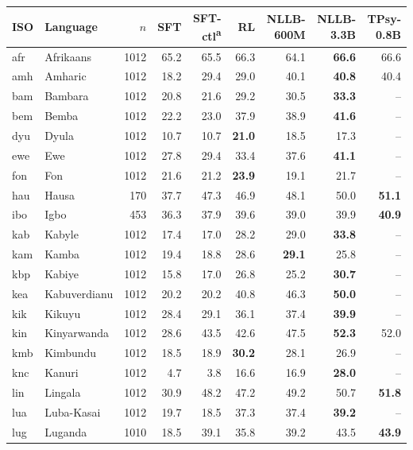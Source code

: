 \begin{table}[t]
\centering\footnotesize
\setlength{\tabcolsep}{3pt}
\begin{tabular}{@{}llrrrrrrr@{}}
\toprule
ISO & Language & $n$ & SFT & SFT-ctl\textsuperscript{a} & RL & NLLB-600M & NLLB-3.3B & TPsy-0.8B \\
\midrule
afr & Afrikaans & 1012 & 65.2 & 65.5 & 66.3 & 64.1 & \textbf{66.6} & 66.6 \\
amh & Amharic & 1012 & 18.2 & 29.4 & 29.0 & 40.1 & \textbf{40.8} & 40.4 \\
bam & Bambara & 1012 & 20.8 & 21.6 & 29.2 & 30.5 & \textbf{33.3} & -- \\
bem & Bemba & 1012 & 22.2 & 23.0 & 37.9 & 38.9 & \textbf{41.6} & -- \\
dyu & Dyula & 1012 & 10.7 & 10.7 & \textbf{21.0} & 18.5 & 17.3 & -- \\
ewe & Ewe & 1012 & 27.8 & 29.4 & 33.4 & 37.6 & \textbf{41.1} & -- \\
fon & Fon & 1012 & 21.6 & 21.2 & \textbf{23.9} & 19.1 & 21.7 & -- \\
hau & Hausa & 170 & 37.7 & 47.3 & 46.9 & 48.1 & 50.0 & \textbf{51.1} \\
ibo & Igbo & 453 & 36.3 & 37.9 & 39.6 & 39.0 & 39.9 & \textbf{40.9} \\
kab & Kabyle & 1012 & 17.4 & 17.0 & 28.2 & 29.0 & \textbf{33.8} & -- \\
kam & Kamba & 1012 & 19.4 & 18.8 & 28.6 & \textbf{29.1} & 25.8 & -- \\
kbp & Kabiye & 1012 & 15.8 & 17.0 & 26.8 & 25.2 & \textbf{30.7} & -- \\
kea & Kabuverdianu & 1012 & 20.2 & 20.2 & 40.8 & 46.3 & \textbf{50.0} & -- \\
kik & Kikuyu & 1012 & 28.4 & 29.1 & 36.1 & 37.4 & \textbf{39.9} & -- \\
kin & Kinyarwanda & 1012 & 28.6 & 43.5 & 42.6 & 47.5 & \textbf{52.3} & 52.0 \\
kmb & Kimbundu & 1012 & 18.5 & 18.9 & \textbf{30.2} & 28.1 & 26.9 & -- \\
knc & Kanuri & 1012 & 4.7 & 3.8 & 16.6 & 16.9 & \textbf{28.0} & -- \\
lin & Lingala & 1012 & 30.9 & 48.2 & 47.2 & 49.2 & 50.7 & \textbf{51.8} \\
lua & Luba-Kasai & 1012 & 19.7 & 18.5 & 37.3 & 37.4 & \textbf{39.2} & -- \\
lug & Luganda & 1010 & 18.5 & 39.1 & 35.8 & 39.2 & 43.5 & \textbf{43.9} \\

\end{tabular}
\end{table}
